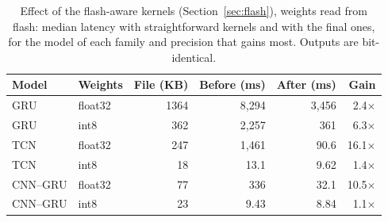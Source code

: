 \begin{table}[t]
\centering
\caption{Effect of the flash-aware kernels (Section~\ref{sec:flash}), weights read from flash: median latency with straightforward kernels and with the final ones, for the model of each family and precision that gains most. Outputs are bit-identical.}
\label{tab:speedup}
\footnotesize
\setlength{\tabcolsep}{4pt}
\begin{tabular}{llrrrr}
\toprule
Model & Weights & File (KB) & Before (ms) & After (ms) & Gain \\
\midrule
GRU & float32 & 1364 & 8{,}294 & 3{,}456 & 2.4$\times$ \\
GRU & int8 & 362 & 2{,}257 & 361 & 6.3$\times$ \\
TCN & float32 & 247 & 1{,}461 & 90.6 & 16.1$\times$ \\
TCN & int8 & 18 & 13.1 & 9.62 & 1.4$\times$ \\
CNN--GRU & float32 & 77 & 336 & 32.1 & 10.5$\times$ \\
CNN--GRU & int8 & 23 & 9.43 & 8.84 & 1.1$\times$ \\
\bottomrule
\end{tabular}
\end{table}
